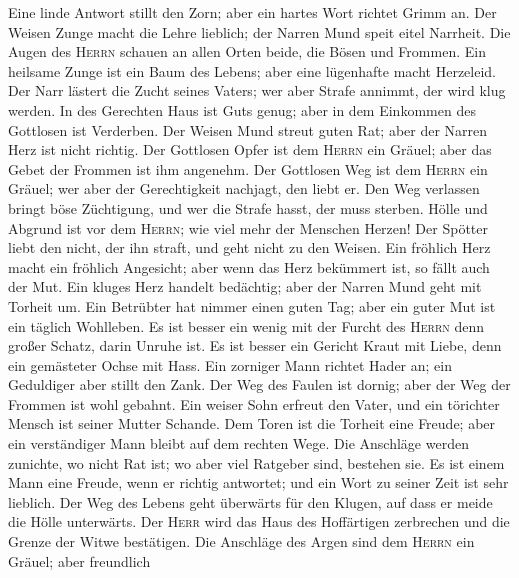  Eine linde Antwort stillt den Zorn; aber ein hartes Wort
richtet Grimm an.  Der Weisen Zunge macht die Lehre
lieblich; der Narren Mund speit eitel Narrheit.  Die Augen
des \textsc{Herrn} schauen an allen Orten beide, die Bösen und Frommen.
 Ein heilsame Zunge ist ein Baum des Lebens; aber eine
lügenhafte macht Herzeleid.  Der Narr lästert die Zucht
seines Vaters; wer aber Strafe annimmt, der wird klug werden.
 In des Gerechten Haus ist Guts genug; aber in dem
Einkommen des Gottlosen ist Verderben.  Der Weisen Mund
streut guten Rat; aber der Narren Herz ist nicht richtig. 
Der Gottlosen Opfer ist dem \textsc{Herrn} ein Gräuel; aber das Gebet
der Frommen ist ihm angenehm.  Der Gottlosen Weg ist dem
\textsc{Herrn} ein Gräuel; wer aber der Gerechtigkeit nachjagt, den
liebt er.  Den Weg verlassen bringt böse Züchtigung, und
wer die Strafe hasst, der muss sterben.  Hölle und
Abgrund ist vor dem \textsc{Herrn}; wie viel mehr der Menschen Herzen!
 Der Spötter liebt den nicht, der ihn straft, und geht
nicht zu den Weisen.  Ein fröhlich Herz macht ein
fröhlich Angesicht; aber wenn das Herz bekümmert ist, so fällt auch der
Mut.  Ein kluges Herz handelt bedächtig; aber der Narren
Mund geht mit Torheit um.  Ein Betrübter hat nimmer einen
guten Tag; aber ein guter Mut ist ein täglich Wohlleben. 
Es ist besser ein wenig mit der Furcht des \textsc{Herrn} denn großer
Schatz, darin Unruhe ist.  Es ist besser ein Gericht
Kraut mit Liebe, denn ein gemästeter Ochse mit Hass.  Ein
zorniger Mann richtet Hader an; ein Geduldiger aber stillt den Zank.
 Der Weg des Faulen ist dornig; aber der Weg der Frommen
ist wohl gebahnt.  Ein weiser Sohn erfreut den Vater, und
ein törichter Mensch ist seiner Mutter Schande.  Dem
Toren ist die Torheit eine Freude; aber ein verständiger Mann bleibt auf
dem rechten Wege.  Die Anschläge werden zunichte, wo
nicht Rat ist; wo aber viel Ratgeber sind, bestehen sie. 
Es ist einem Mann eine Freude, wenn er richtig antwortet; und ein Wort
zu seiner Zeit ist sehr lieblich.  Der Weg des Lebens
geht überwärts für den Klugen, auf dass er meide die Hölle unterwärts.
 Der \textsc{Herr} wird das Haus des Hoffärtigen
zerbrechen und die Grenze der Witwe bestätigen.  Die
Anschläge des Argen sind dem \textsc{Herrn} ein Gräuel; aber freundlich
